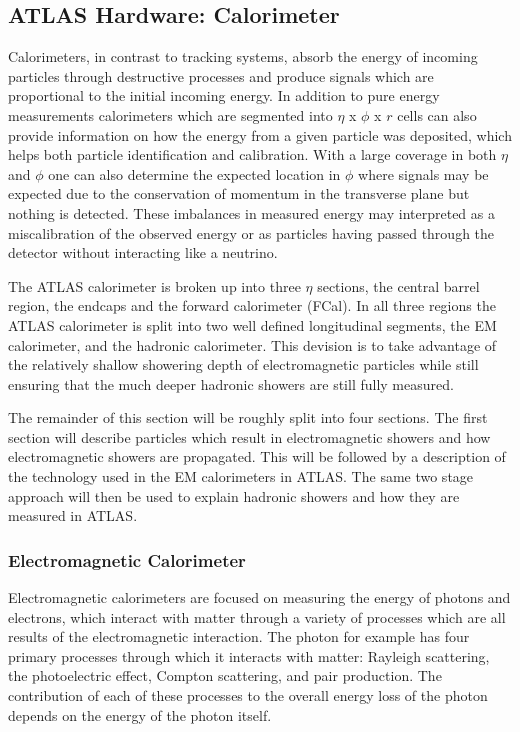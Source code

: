 \subsection{ATLAS Hardware: Calorimeter}

Calorimeters, in contrast to tracking systems, absorb the energy of incoming particles through destructive processes and produce signals which are proportional to the initial incoming energy.  
In addition to pure energy measurements calorimeters which are segmented into $\eta$ x $\phi$ x $r$ cells can also provide information on how the energy from a given particle was deposited, which helps both particle identification and calibration.  
With a large coverage in both $\eta$ and $\phi$ one can also determine the expected location in $\phi$ where signals may be expected due to the conservation of momentum in the transverse plane but nothing is detected.  
These imbalances in measured energy may interpreted as a miscalibration of the observed energy or as particles having passed through the detector without interacting like a neutrino.  

The ATLAS calorimeter is broken up into three $\eta$ sections, the central barrel region, the endcaps and the forward calorimeter (FCal).  
In all three regions the ATLAS calorimeter is split into two well defined longitudinal segments, the \gls{EM} calorimeter, and the hadronic calorimeter.   
This devision is to take advantage of the relatively shallow showering depth of electromagnetic particles while still ensuring that the much deeper hadronic showers are still fully measured.  

The remainder of this section will be roughly split into four sections.  
The first section will describe particles which result in electromagnetic showers and how electromagnetic showers are propagated.  
This will be followed by a description of the technology used in the EM calorimeters in ATLAS.  
The same two stage approach will then be used to explain hadronic showers and how they are measured in ATLAS.  

\subsubsection{Electromagnetic Calorimeter}
\label{EMCalo} 

Electromagnetic calorimeters are focused on measuring the energy of photons and electrons, which interact with matter through a variety of processes which are all results of the electromagnetic interaction.  
The photon for example has four primary processes through which it interacts with matter: Rayleigh scattering, the photoelectric effect, Compton scattering, and pair production.  
The contribution of each of these processes to the overall energy loss of the photon depends on the energy of the photon itself.  

